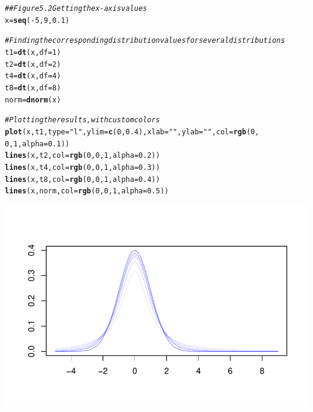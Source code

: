 \documentclass{report}\usepackage[]{graphicx}\usepackage[]{color}
\makeatletter
\def\maxwidth{ %
  \ifdim\Gin@nat@width>\linewidth
    \linewidth
  \else
    \Gin@nat@width
  \fi
}
\newcommand{\hlnum}[1]{\textcolor[rgb]{0.686,0.059,0.569}{#1}}%
\newcommand{\hlstr}[1]{\textcolor[rgb]{0.192,0.494,0.8}{#1}}%
\newcommand{\hlcom}[1]{\textcolor[rgb]{0.678,0.584,0.686}{\textit{#1}}}%
\newcommand{\hlopt}[1]{\textcolor[rgb]{0,0,0}{#1}}%
\newcommand{\hlstd}[1]{\textcolor[rgb]{0.345,0.345,0.345}{#1}}%
\newcommand{\hlkwb}[1]{\textcolor[rgb]{0.69,0.353,0.396}{#1}}%
\newcommand{\hlkwc}[1]{\textcolor[rgb]{0.333,0.667,0.333}{#1}}%
\newcommand{\hlkwd}[1]{\textcolor[rgb]{0.737,0.353,0.396}{\textbf{#1}}}%
\newenvironment{kframe}{%
 \def\at@end@of@kframe{}%
 \ifinner\ifhmode%
  \def\at@end@of@kframe{\end{minipage}}%
  \begin{minipage}{\columnwidth}%
 \fi\fi%
 \def\FrameCommand##1{\hskip\@totalleftmargin \hskip-\fboxsep
 \colorbox{shadecolor}{##1}\hskip-\fboxsep
     \hskip-\linewidth \hskip-\@totalleftmargin \hskip\columnwidth}%
 \MakeFramed {\advance\hsize-\width
   \@totalleftmargin\z@ \linewidth\hsize
   \@setminipage}}%
 {\par\unskip\endMakeFramed%
 \at@end@of@kframe}
\newenvironment{knitrout}{}{} %
\makeatother
\begin{document}
\begin{knitrout}
\color{fgcolor}\begin{kframe}
\begin{alltt}
\hlcom{## Figure 5.2 Getting the x-axis values}
\hlstd{x} \hlkwb{=} \hlkwd{seq}\hlstd{(}\hlopt{-}\hlnum{5}\hlstd{,} \hlnum{9}\hlstd{,} \hlnum{0.1}\hlstd{)}

\hlcom{# Finding the corresponding distribution values for several distributions}
\hlstd{t1} \hlkwb{=} \hlkwd{dt}\hlstd{(x,} \hlkwc{df} \hlstd{=} \hlnum{1}\hlstd{)}
\hlstd{t2} \hlkwb{=} \hlkwd{dt}\hlstd{(x,} \hlkwc{df} \hlstd{=} \hlnum{2}\hlstd{)}
\hlstd{t4} \hlkwb{=} \hlkwd{dt}\hlstd{(x,} \hlkwc{df} \hlstd{=} \hlnum{4}\hlstd{)}
\hlstd{t8} \hlkwb{=} \hlkwd{dt}\hlstd{(x,} \hlkwc{df} \hlstd{=} \hlnum{8}\hlstd{)}
\hlstd{norm} \hlkwb{=} \hlkwd{dnorm}\hlstd{(x)}

\hlcom{# Plotting the results, with custom colors}
\hlkwd{plot}\hlstd{(x, t1,} \hlkwc{type} \hlstd{=} \hlstr{"l"}\hlstd{,} \hlkwc{ylim} \hlstd{=} \hlkwd{c}\hlstd{(}\hlnum{0}\hlstd{,} \hlnum{0.4}\hlstd{),} \hlkwc{xlab} \hlstd{=} \hlstr{""}\hlstd{,} \hlkwc{ylab} \hlstd{=} \hlstr{""}\hlstd{,} \hlkwc{col} \hlstd{=} \hlkwd{rgb}\hlstd{(}\hlnum{0}\hlstd{,}
    \hlnum{0}\hlstd{,} \hlnum{1}\hlstd{,} \hlkwc{alpha} \hlstd{=} \hlnum{0.1}\hlstd{))}
\hlkwd{lines}\hlstd{(x, t2,} \hlkwc{col} \hlstd{=} \hlkwd{rgb}\hlstd{(}\hlnum{0}\hlstd{,} \hlnum{0}\hlstd{,} \hlnum{1}\hlstd{,} \hlkwc{alpha} \hlstd{=} \hlnum{0.2}\hlstd{))}
\hlkwd{lines}\hlstd{(x, t4,} \hlkwc{col} \hlstd{=} \hlkwd{rgb}\hlstd{(}\hlnum{0}\hlstd{,} \hlnum{0}\hlstd{,} \hlnum{1}\hlstd{,} \hlkwc{alpha} \hlstd{=} \hlnum{0.3}\hlstd{))}
\hlkwd{lines}\hlstd{(x, t8,} \hlkwc{col} \hlstd{=} \hlkwd{rgb}\hlstd{(}\hlnum{0}\hlstd{,} \hlnum{0}\hlstd{,} \hlnum{1}\hlstd{,} \hlkwc{alpha} \hlstd{=} \hlnum{0.4}\hlstd{))}
\hlkwd{lines}\hlstd{(x, norm,} \hlkwc{col} \hlstd{=} \hlkwd{rgb}\hlstd{(}\hlnum{0}\hlstd{,} \hlnum{0}\hlstd{,} \hlnum{1}\hlstd{,} \hlkwc{alpha} \hlstd{=} \hlnum{0.5}\hlstd{))}
\end{alltt}
\end{kframe}

{\centering \includegraphics[width=\maxwidth]{figure/unnamed-chunk-83-1} 

}



\end{knitrout}
\end{document}
